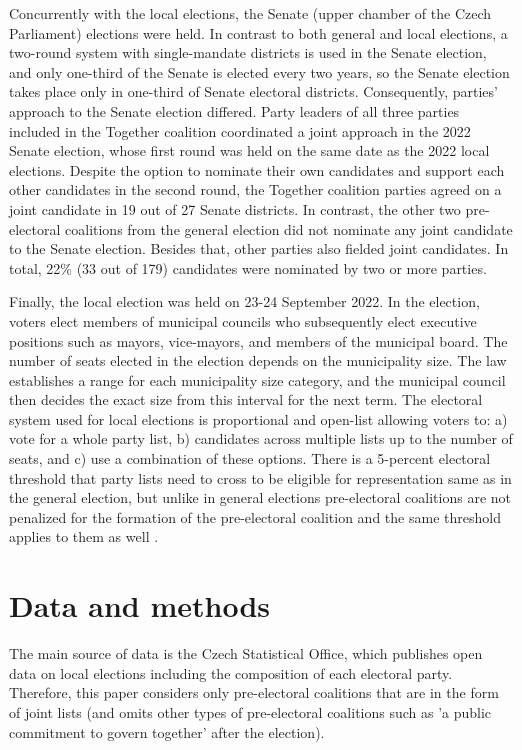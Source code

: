 \documentclass[]{interact}
\theoremstyle{plain}%
\theoremstyle{definition}
\theoremstyle{remark}
\begin{document}
Concurrently with the local elections, the Senate (upper chamber of the Czech Parliament) elections were held. In contrast to both general and local elections, a two-round system with single-mandate districts is used in the Senate election, and only one-third of the Senate is elected every two years, so the Senate election takes place only in one-third of Senate electoral districts. Consequently, parties' approach to the Senate election differed. Party leaders of all three parties included in the Together coalition coordinated a joint approach in the 2022 Senate election, whose first round was held on the same date as the 2022 local elections. 
Despite the option to nominate their own candidates and support each other candidates in the second round, the Together coalition parties agreed on a joint candidate in 19 out of 27 Senate districts. In contrast, the other two pre-electoral coalitions from the general election did not nominate any joint candidate to the Senate election. Besides that, other parties also fielded joint candidates. In total, 22\% (33 out of 179) candidates were nominated by two or more parties.

Finally, the local election was held on 23-24 September 2022. In the election, voters elect members of municipal councils who subsequently elect executive positions such as mayors, vice-mayors, and members of the municipal board. The number of seats elected in the election depends on the municipality size. The law establishes a range for each municipality size category, and the municipal council then decides the exact size from this interval for the next term. The electoral system used for local elections is proportional and open-list allowing voters to: a) vote for a whole party list, b) candidates across multiple lists up to the number of seats, and c) use a combination of these options. There is a 5-percent electoral threshold that party lists need to cross to be eligible for representation same as in the general election, but unlike in general elections pre-electoral coalitions are not penalized for the formation of the pre-electoral coalition and the same threshold applies to them as well \citep{voda2022}. 

\section{Data and methods}

The main source of data is the Czech Statistical Office, which publishes open data on local elections including the composition of each electoral party. Therefore, this paper considers only pre-electoral coalitions that are in the form of joint lists (and omits other types of pre-electoral coalitions such as 'a public commitment to govern together' after the election). 
\end{document}
